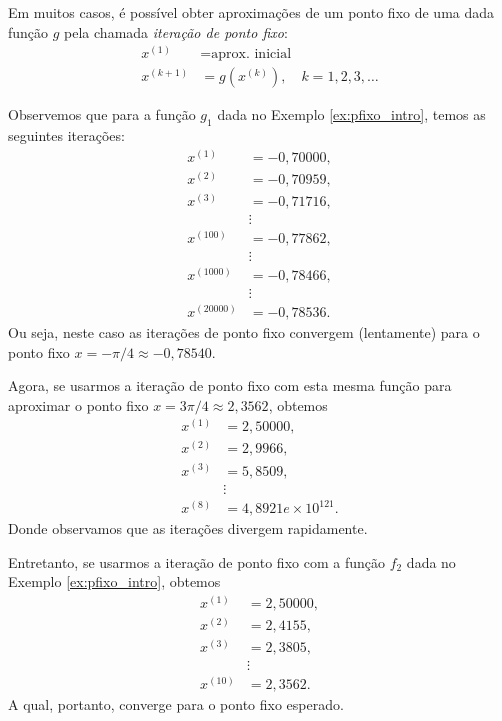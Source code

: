 Em muitos casos, é possível obter aproximações de um ponto fixo de uma dada função $g$ pela chamada \emph{iteração de ponto fixo}:
\begin{align}
  x^{(1)} &= \text{aprox. inicial}\\
  x^{(k+1)} &= g(x^{(k)}),\quad k=1, 2, 3, \ldots
\end{align}

\begin{ex}\label{ex:pfixo_testes}
  Observemos que para a função $g_1$ dada no Exemplo \ref{ex:pfixo_intro}, temos as seguintes iterações:
  \begin{align}
    x^{(1)} &= -0,70000,\\
    x^{(2)} &= -0,70959,\\
    x^{(3)} &= -0,71716,\\
    &\vdots \\
    x^{(100)} &= -0,77862,\\
    &\vdots \\
    x^{(1000)} &= -0,78466,\\    
    &\vdots \\
    x^{(20000)} &= -0,78536.
  \end{align}
Ou seja, neste caso as iterações de ponto fixo convergem (lentamente) para o ponto fixo $x=-\pi/4\approx -0,78540$.

Agora, se usarmos a iteração de ponto fixo com esta mesma função para aproximar o ponto fixo $x=3\pi/4\approx 2,3562$, obtemos
  \begin{align}
    x^{(1)} &= 2,50000,\\
    x^{(2)} &= 2,9966,\\
    x^{(3)} &= 5,8509,\\
    &\vdots \\
    x^{(8)} &= 4,8921e\times 10^{121}.
  \end{align}
Donde observamos que as iterações divergem rapidamente.

Entretanto, se usarmos a iteração de ponto fixo com a função $f_2$ dada no Exemplo \ref{ex:pfixo_intro}, obtemos
  \begin{align}
    x^{(1)} &= 2,50000,\\
    x^{(2)} &= 2,4155,\\
    x^{(3)} &= 2,3805,\\
    &\vdots \\
    x^{(10)} &= 2,3562.
  \end{align}
A qual, portanto, converge para o ponto fixo esperado.
\end{ex}

